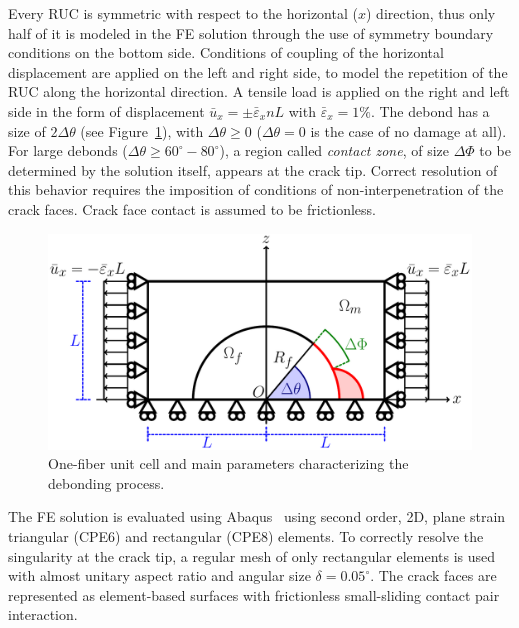 \documentclass[12pt,a4paper]{article}
\begin{document}
Every RUC is symmetric with respect to the horizontal ($x$) direction, thus only half of it is modeled in the FE solution through the use of symmetry boundary conditions on the bottom side. Conditions of coupling of the horizontal displacement are applied on the left and right side, to model the repetition of the RUC along the horizontal direction. A tensile load is applied on the right and left side in the form of displacement $\bar{u}_{x}=\pm\bar{\varepsilon}_{x}nL$ with $\bar{\varepsilon}_{x}=1\%$. The debond has a size of $2\Delta\theta$ (see Figure~\ref{fig:ruc}), with $\Delta\theta\geq0$ ($\Delta\theta=0$ is the case of no damage at all). For large debonds ($\Delta\theta\geq 60^{\circ}-80^{\circ}$), a region called \emph{contact zone}, of size $\Delta\Phi$ to be determined by the solution itself, appears at the crack tip. Correct resolution of this behavior requires the imposition of conditions of non-interpenetration of the crack faces. Crack face contact is assumed to be frictionless.

\begin{figure}[!h]
\centering
        \includegraphics[height=0.25\textheight]{RUC.pdf}
\caption{One-fiber unit cell and main parameters characterizing the debonding process.}\label{fig:ruc}
\end{figure}

The FE solution is evaluated using Abaqus~\cite{abq12} using second order, 2D, plane strain triangular (CPE6) and rectangular (CPE8) elements. To correctly resolve the singularity at the crack tip, a regular mesh of only rectangular elements is used with almost unitary aspect ratio and angular size $\delta=0.05^{\circ}$. The crack faces are represented as element-based surfaces with frictionless small-sliding contact pair interaction.
\end{document}
